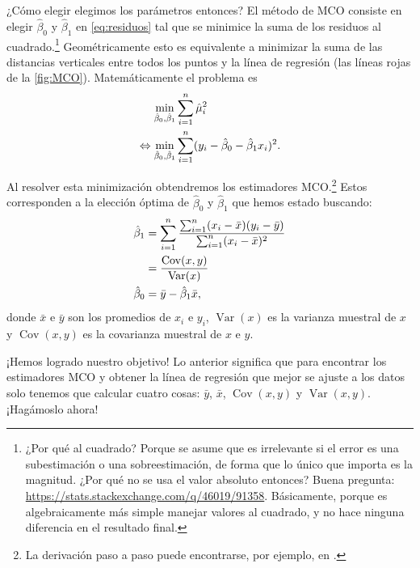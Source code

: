 \documentclass[12pt]{report}\usepackage[]{graphicx}\usepackage[]{color}
\newcommand{\Var}{\operatorname{Var}}
\newcommand{\Cov}{\operatorname{Cov}}
\begin{document}
¿Cómo elegir elegimos los parámetros entonces?
El método de MCO consiste en elegir $\hat\beta_0$ y $\hat\beta_1$ en \eqref{eq:residuos} tal que se minimice la suma de los residuos al cuadrado.\footnote{¿Por qué al cuadrado? Porque se asume que es irrelevante si el error es una subestimación o una sobreestimación, de forma que lo único que importa es la magnitud. ¿Por qué no se usa el valor absoluto entonces? Buena pregunta: \url{https://stats.stackexchange.com/q/46019/91358}. Básicamente, porque es algebraicamente más simple manejar valores al cuadrado, y no hace ninguna diferencia en el resultado final.}
Geométricamente esto es equivalente a minimizar la suma de las distancias verticales entre todos los puntos y la línea de regresión (las líneas rojas de la \autoref{fig:MCO}).
Matemáticamente el problema es
\begin{align}
\min_{\hat\beta_0,\hat\beta_1} & \sum_{i=1}^n \hat\mu_i^2 \notag \\
\Leftrightarrow \min_{\hat\beta_0,\hat\beta_1} & \sum_{i=1}^n (y_i - \hat\beta_0 - \hat\beta_1 x_i)^2.
\label{eq:prob_min_MCO}
\end{align}

Al resolver esta minimización obtendremos los estimadores MCO.\footnote{La derivación paso a paso puede encontrarse, por ejemplo, en \textcite[cap. 2]{wooldridge_introductory_2016}.}
Estos corresponden a la elección óptima de $\hat\beta_0$ y $\hat\beta_1$ que hemos estado buscando:
\begin{align}
\hat \beta_1 &= \sum_{i=1}^n \frac{\sum_{i=1}^n (x_i - \bar x)(y_i - \bar y)}{\sum_{i=1}^n (x_i - \bar x)^2} \notag \\
 &= \frac{\Cov (x,y)}{\Var(x)} \label{eq:MCO_beta1} \\
\hat \beta_0 &= \bar y - \hat\beta_1 \bar x, \label{eq:MCO_beta0}
\end{align}
donde $\bar x$ e $\bar y$ son los promedios de $x_i$ e $y_i$, $\Var(x)$ es la varianza muestral de $x$ y $\Cov(x,y)$ es la covarianza muestral de $x$ e $y$.

¡Hemos logrado nuestro objetivo!
Lo anterior significa que para encontrar los estimadores MCO y obtener la línea de regresión que mejor se ajuste a los datos solo tenemos que calcular cuatro cosas: $\bar y$, $\bar x$, $\Cov (x,y)$ y $\Var (x,y)$. ¡Hagámoslo ahora!
\end{document}
